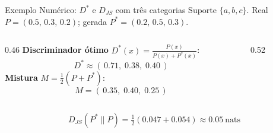 \documentclass[aspectratio=169,xcolor=dvipsnames]{beamer}
\begin{document}
  \begin{frame}{Exemplo Numérico: $D^{*}$ e $D_{JS}$ com três categorias}
    Suporte $\{a, b, c\}$.
    Real $P = (0.5,\, 0.3,\, 0.2)$;\quad
    gerada $P^{*} = (0.2,\, 0.5,\, 0.3)$.
    \begin{columns}[T]
      \begin{column}{0.46\textwidth}
        \textbf{Discriminador ótimo} $D^{*}(x) = \frac{P(x)}{P(x) + P^{*}(x)}$:
        \[
          D^{*} \approx (\, 0.71,\; 0.38,\; 0.40 \,)
        \]
        \textbf{Mistura} $M = \tfrac{1}{2}(P + P^{*})$:
        \[
          M = (\, 0.35,\; 0.40,\; 0.25 \,)
        \]
      \end{column}
      \begin{column}{0.52\textwidth}
        \centering
      \end{column}
    \end{columns}
    \[
      D_{JS}(P^{*} \| P) = \tfrac{1}{2}(0.047 + 0.054) \approx \mathbf{0.05}\ \text{nats}
    \]
  \end{frame}
\end{document}
